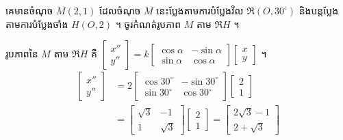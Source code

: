 \begin{example}[លំហាត់គំរូ]
គេមានចំណុច $M(2, 1)$ ដែលចំណុច $M$ នេះប្លែងតាមការបំប្លែងវិល $\mathfrak{R}(O, 30^\circ)$ និងបន្តប្លែងតាមការបំប្លែងចាំង $H(O, 2)$ ។ ចូរកំណត់រូបភាព $M$ តាម $\mathfrak{R}H$ ។
\end{example}
\ans
រូបភាពនៃ $M$ តាម $\mathfrak{R}H$ គឺ $\begin{bmatrix} x''\\ y'' \end{bmatrix} = k\begin{bmatrix} \cos\alpha & -\sin\alpha\\ \sin\alpha & \cos\alpha \end{bmatrix}\begin{bmatrix} x\\ y \end{bmatrix}$ ។
\[
\begin{aligned}
\begin{bmatrix} x''\\ y'' \end{bmatrix} &= 2\begin{bmatrix} \cos 30^\circ & -\sin 30^\circ\\ \sin 30^\circ & \cos 30^\circ \end{bmatrix}\begin{bmatrix} 2\\ 1 \end{bmatrix}\\
&= \begin{bmatrix} \sqrt{3} & -1\\ 1 & \sqrt{3} \end{bmatrix}\begin{bmatrix} 2\\ 1 \end{bmatrix} = \begin{bmatrix} 2\sqrt{3} - 1\\ 2 + \sqrt{3} \end{bmatrix}
\end{aligned}
\]

